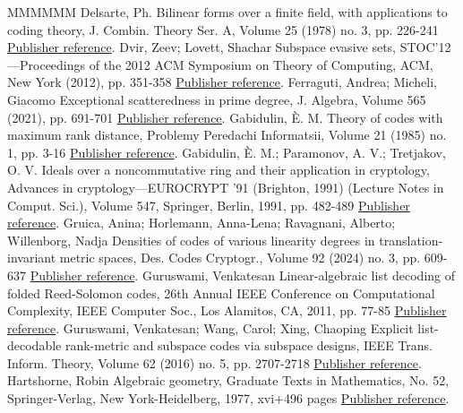 \documentclass[11pt]{article}
\theoremstyle{definition}
\numberwithin{equation}{section}
\begin{document}
\begin{thebibliography}{MMMMMM}
 Delsarte, Ph. Bilinear forms over a finite field, with applications to coding theory, J. Combin. Theory Ser. A, Volume 25 (1978) no. 3, pp. 226-241 \href{https://alco.centre-mersenne.org/articles/10.5802/alco.377/#delsarte1978bilinear}{Publisher reference}.
 Dvir, Zeev; Lovett, Shachar Subspace evasive sets, STOC’12—Proceedings of the 2012 ACM Symposium on Theory of Computing, ACM, New York (2012), pp. 351-358 \href{https://alco.centre-mersenne.org/articles/10.5802/alco.377/#dvir2012subspace}{Publisher reference}.
 Ferraguti, Andrea; Micheli, Giacomo Exceptional scatteredness in prime degree, J. Algebra, Volume 565 (2021), pp. 691-701 \href{https://alco.centre-mersenne.org/articles/10.5802/alco.377/#MR4163074}{Publisher reference}.
 Gabidulin, È. M. Theory of codes with maximum rank distance, Problemy Peredachi Informatsii, Volume 21 (1985) no. 1, pp. 3-16 \href{https://alco.centre-mersenne.org/articles/10.5802/alco.377/#gabidulin1985theory}{Publisher reference}.
 Gabidulin, È. M.; Paramonov, A. V.; Tretjakov, O. V. Ideals over a noncommutative ring and their application in cryptology, Advances in cryptology—EUROCRYPT ’91 (Brighton, 1991) (Lecture Notes in Comput. Sci.), Volume 547, Springer, Berlin, 1991, pp. 482-489 \href{https://alco.centre-mersenne.org/articles/10.5802/alco.377/#gabidulin1991ideals}{Publisher reference}.
 Gruica, Anina; Horlemann, Anna-Lena; Ravagnani, Alberto; Willenborg, Nadja Densities of codes of various linearity degrees in translation-invariant metric spaces, Des. Codes Cryptogr., Volume 92 (2024) no. 3, pp. 609-637 \href{https://alco.centre-mersenne.org/articles/10.5802/alco.377/#gruica2024densities}{Publisher reference}.
 Guruswami, Venkatesan Linear-algebraic list decoding of folded Reed-Solomon codes, 26th Annual IEEE Conference on Computational Complexity, IEEE Computer Soc., Los Alamitos, CA, 2011, pp. 77-85 \href{https://alco.centre-mersenne.org/articles/10.5802/alco.377/#guruswami2011linear}{Publisher reference}.
 Guruswami, Venkatesan; Wang, Carol; Xing, Chaoping Explicit list-decodable rank-metric and subspace codes via subspace designs, IEEE Trans. Inform. Theory, Volume 62 (2016) no. 5, pp. 2707-2718 \href{https://alco.centre-mersenne.org/articles/10.5802/alco.377/#guruswami2016explicit}{Publisher reference}.
 Hartshorne, Robin Algebraic geometry, Graduate Texts in Mathematics, No. 52, Springer-Verlag, New York-Heidelberg, 1977, xvi+496 pages \href{https://alco.centre-mersenne.org/articles/10.5802/alco.377/#Hartshorne}{Publisher reference}.

\end{thebibliography}
\end{document}

